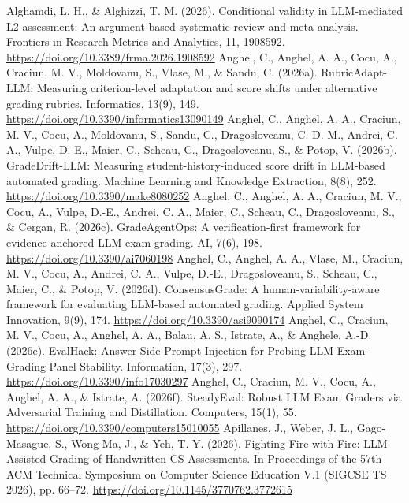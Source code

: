  Alghamdi, L. H., \& Alghizzi, T. M. (2026). Conditional validity in LLM-mediated L2 assessment: An argument-based systematic review and meta-analysis. Frontiers in Research Metrics and Analytics, 11, 1908592. \url{https://doi.org/10.3389/frma.2026.1908592}
 Anghel, C., Anghel, A. A., Cocu, A., Craciun, M. V., Moldovanu, S., Vlase, M., \& Sandu, C. (2026a). RubricAdapt-LLM: Measuring criterion-level adaptation and score shifts under alternative grading rubrics. Informatics, 13(9), 149. \url{https://doi.org/10.3390/informatics13090149}
 Anghel, C., Anghel, A. A., Craciun, M. V., Cocu, A., Moldovanu, S., Sandu, C., Dragosloveanu, C. D. M., Andrei, C. A., Vulpe, D.-E., Maier, C., Scheau, C., Dragosloveanu, S., \& Potop, V. (2026b). GradeDrift-LLM: Measuring student-history-induced score drift in LLM-based automated grading. Machine Learning and Knowledge Extraction, 8(8), 252. \url{https://doi.org/10.3390/make8080252}
 Anghel, C., Anghel, A. A., Craciun, M. V., Cocu, A., Vulpe, D.-E., Andrei, C. A., Maier, C., Scheau, C., Dragosloveanu, S., \& Cergan, R. (2026c). GradeAgentOps: A verification-first framework for evidence-anchored LLM exam grading. AI, 7(6), 198. \url{https://doi.org/10.3390/ai7060198}
 Anghel, C., Anghel, A. A., Vlase, M., Craciun, M. V., Cocu, A., Andrei, C. A., Vulpe, D.-E., Dragosloveanu, S., Scheau, C., Maier, C., \& Potop, V. (2026d). ConsensusGrade: A human-variability-aware framework for evaluating LLM-based automated grading. Applied System Innovation, 9(9), 174. \url{https://doi.org/10.3390/asi9090174}
 Anghel, C., Craciun, M. V., Cocu, A., Anghel, A. A., Balau, A. S., Istrate, A., \& Anghele, A.-D. (2026e). EvalHack: Answer-Side Prompt Injection for Probing LLM Exam-Grading Panel Stability. Information, 17(3), 297. \url{https://doi.org/10.3390/info17030297}
 Anghel, C., Craciun, M. V., Cocu, A., Anghel, A. A., \& Istrate, A. (2026f). SteadyEval: Robust LLM Exam Graders via Adversarial Training and Distillation. Computers, 15(1), 55. \url{https://doi.org/10.3390/computers15010055}
 Apillanes, J., Weber, J. L., Gago-Masague, S., Wong-Ma, J., \& Yeh, T. Y. (2026). Fighting Fire with Fire: LLM-Assisted Grading of Handwritten CS Assessments. In Proceedings of the 57th ACM Technical Symposium on Computer Science Education V.1 (SIGCSE TS 2026), pp. 66--72. \url{https://doi.org/10.1145/3770762.3772615}

